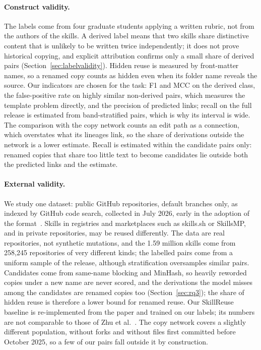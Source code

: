 \documentclass[sigconf,screen]{acmart}
\begin{document}
\paragraph{Construct validity.} The labels come from four graduate students applying a written rubric, not from the authors of the skills. A derived label means that two skills share distinctive content that is unlikely to be written twice independently; it does not prove historical copying, and explicit attribution confirms only a small share of derived pairs (Section~\ref{sec:labelvalidity}). Hidden reuse is measured by front-matter names, so a renamed copy counts as hidden even when its folder name reveals the source. Our indicators are chosen for the task: F1 and MCC on the derived class, the false-positive rate on highly similar non-derived pairs, which measures the template problem directly, and the precision of predicted links; recall on the full release is estimated from \ResRCNeg{} band-stratified pairs, which is why its interval is wide. The comparison with the copy network counts an edit path as a connection, which overstates what its lineages link, so the share of derivations outside the network is a lower estimate. Recall is estimated within the candidate pairs only: renamed copies that share too little text to become candidates lie outside both the predicted links and the estimate.
 
\paragraph{External validity.} We study one dataset: public GitHub repositories, default branches only, as indexed by GitHub code search, collected in July 2026, early in the adoption of the format~\cite{destefanis2027gitskills}. Skills in registries and marketplaces such as skills.sh or SkillsMP, and in private repositories, may be reused differently. The data are real repositories, not synthetic mutations, and the 1.59 million skills come from 258,245 repositories of very different kinds; the labelled pairs come from a uniform sample of the release, although stratification oversamples similar pairs. Candidates come from same-name blocking and MinHash, so heavily reworded copies under a new name are never scored, and the derivations the model misses among the candidates are renamed copies too (Section~\ref{sec:rq3}); the share of hidden reuse is therefore a lower bound for renamed reuse. Our SkillReuse baseline is re-implemented from the paper and trained on our labels; its numbers are not comparable to those of Zhu et al.~\cite{zhu2026skillreuse}. The copy network covers a slightly different population, without forks and without files first committed before October 2025, so a few of our pairs fall outside it by construction.
\end{document}
